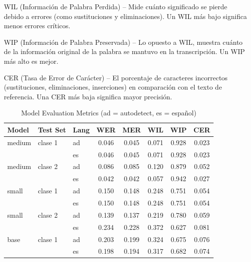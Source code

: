 WIL (Información de Palabra Perdida) – Mide cuánto significado se pierde debido a errores (como sustituciones y eliminaciones). Un WIL más bajo significa menos errores críticos.

WIP (Información de Palabra Preservada) – Lo opuesto a WIL, muestra cuánto de la información original de la palabra se mantuvo en la transcripción. Un WIP más alto es mejor.

CER (Tasa de Error de Carácter) – El porcentaje de caracteres incorrectos (sustituciones, eliminaciones, inserciones) en comparación con el texto de referencia. Una CER más baja significa mayor precisión.

\begin{table}[htbp]
\centering
\caption{Model Evaluation Metrics (ad = autodetect, es = español)}
\begin{tabular}{l l l S[table-format=1.3] S[table-format=1.3] S[table-format=1.3] S[table-format=1.3] S[table-format=1.3]}
\toprule
\textbf{Model} & \textbf{Test Set} & \textbf{Lang} & \textbf{WER} & \textbf{MER} & \textbf{WIL} & \textbf{WIP} & \textbf{CER} \\
\midrule
medium & clase 1 & ad & 0.046 & 0.045 & 0.071 & 0.928 & 0.023 \\
       &               & es & 0.046 & 0.045 & 0.071 & 0.928 & 0.023 \\
\cmidrule(r){1-8}
medium & clase 2 & ad & 0.086 & 0.085 & 0.120 & 0.879 & 0.052 \\
       &               & es & 0.042 & 0.042 & 0.057 & 0.942 & 0.027 \\
\midrule
small  & clase 1 & ad & 0.150 & 0.148 & 0.248 & 0.751 & 0.054 \\
       &               & es & 0.150 & 0.148 & 0.248 & 0.751 & 0.054 \\
\cmidrule(r){1-8}
small  & clase 2 & ad & 0.139 & 0.137 & 0.219 & 0.780 & 0.059 \\
       &               & es & 0.234 & 0.228 & 0.372 & 0.627 & 0.081 \\
\midrule
base   & clase 1 & ad & 0.203 & 0.199 & 0.324 & 0.675 & 0.076 \\
       &               & es & 0.198 & 0.194 & 0.317 & 0.682 & 0.074 \\
\bottomrule
\end{tabular}
\end{table}
